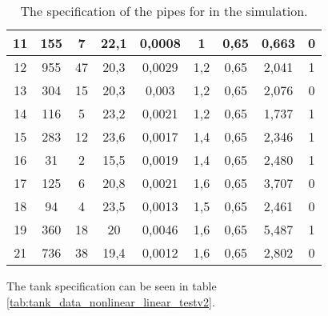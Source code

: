 \begin{table}[H]
\begin{tabular}{|c|c|c|c|c|c|c|c|c|}
11                                                         & 155            & 7        & 22,1       & 0,0008 & 1         & 0,65     & 0,663     &0         \\ \hline
12                                                         & 955            & 47       & 20,3       & 0,0029 & 1,2       & 0,65     & 2,041     &1         \\ \hline
13                                                         & 304            & 15       & 20,3       & 0,003  & 1,2       & 0,65     & 2,076     &0         \\ \hline
14                                                         & 116            & 5        & 23,2       & 0,0021 & 1,2       & 0,65     & 1,737     &1         \\ \hline
15                                                         & 283            & 12       & 23,6       & 0,0017 & 1,4       & 0,65     & 2,346     &1          \\ \hline
16                                                         & 31             & 2        & 15,5       & 0,0019 & 1,4       & 0,65     & 2,480     &1          \\ \hline
17                                                         & 125            & 6        & 20,8       & 0,0021 & 1,6       & 0,65     & 3,707     &0          \\ \hline
18                                                         & 94             & 4        & 23,5       & 0,0013 & 1,5       & 0,65     & 2,461     &0             \\ \hline
19                                                         & 360            & 18       & 20         & 0,0046 & 1,6       & 0,65     & 5,487     &1           \\ \hline
21                                                         & 736            & 38       & 19,4         & 0,0012 & 1,6       & 0,65     & 2,802   &0          \\ \hline
\end{tabular}
\caption{The specification of the pipes for in the simulation.}
\label{tab:pipe_data_nonlinear_linear_testv2}
\end{table}

The tank specification can be seen in table \ref{tab:tank_data_nonlinear_linear_testv2}.

